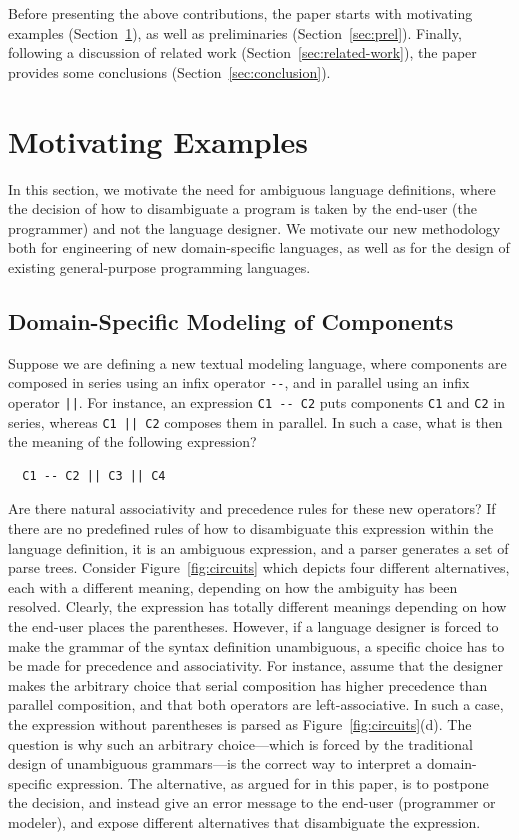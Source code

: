 \documentclass[runningheads]{llncs}
\begin{document}
\noindent Before presenting the above contributions, the paper starts with motivating examples (Section~\ref{sec:motivation}), as well as preliminaries (Section~\ref{sec:prel}). Finally, following a discussion of related work (Section~\ref{sec:related-work}), the paper provides some conclusions (Section~\ref{sec:conclusion}).




\section{Motivating Examples}
\label{sec:motivation}
In this section, we motivate the need for ambiguous language definitions, where the decision of how to disambiguate a program is taken by the end-user (the programmer) and not the language designer. We motivate our new methodology both for engineering of new domain-specific languages, as well as for the design of existing general-purpose programming languages.

\subsection{Domain-Specific Modeling of Components}
Suppose we are defining a new textual modeling language, where components are composed in series using an infix operator \verb~--~, and in parallel using an infix operator \verb~||~. For instance, an expression \verb~C1 -- C2~ puts components \verb~C1~ and \verb~C2~ in series, whereas \verb~C1 || C2~ composes them in parallel. In such a case, what is then the meaning of the following expression?
\begin{verbatim}
  C1 -- C2 || C3 || C4
\end{verbatim}

\noindent Are there natural associativity and precedence rules for these new operators? If there are no predefined rules of how to disambiguate this expression within the language definition, it is an ambiguous expression, and a parser generates a set of parse trees. Consider Figure~\ref{fig:circuits} which depicts four different alternatives, each with a different meaning, depending on how the ambiguity has been resolved. Clearly, the expression has totally different meanings depending on how the end-user places the parentheses. However, if a language designer is forced to make the grammar of the syntax definition unambiguous, a specific choice has to be made for precedence and associativity. For instance, assume that the designer makes the arbitrary choice that serial composition has higher precedence than parallel composition, and that both operators are left-associative. In such a case, the expression without parentheses is parsed as Figure~\ref{fig:circuits}(d). The question is why such an arbitrary choice---which is forced by the traditional design of unambiguous grammars---is the correct way to interpret a domain-specific expression. The alternative, as argued for in this paper, is to postpone the decision, and instead give an error message to the end-user (programmer or modeler), and expose different alternatives that disambiguate the expression.
\end{document}
